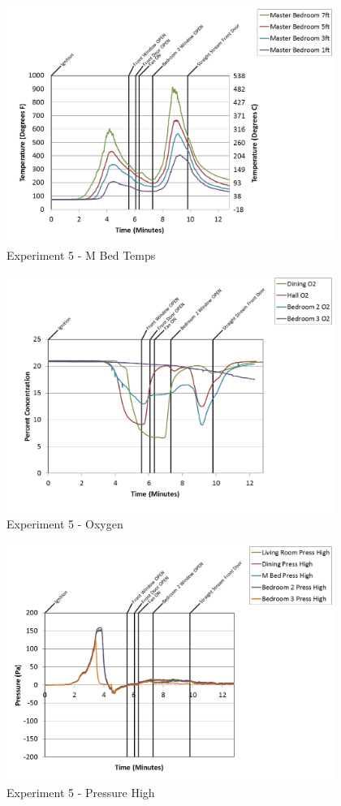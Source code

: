\documentclass{article}
\begin{document}
\begin{appendices}
\clearpage

\begin{figure}[h!]
	\centering
	\includegraphics[height=3.05in]{0_Images/Results_Charts/Exp_5_Charts/MBedTemps.png}
	\caption{Experiment 5 - M Bed Temps}
\end{figure}


\begin{figure}[h!]
	\centering
	\includegraphics[height=3.05in]{0_Images/Results_Charts/Exp_5_Charts/Oxygen.png}
	\caption{Experiment 5 - Oxygen}
\end{figure}

\clearpage

\begin{figure}[h!]
	\centering
	\includegraphics[height=3.05in]{0_Images/Results_Charts/Exp_5_Charts/PressureHigh.png}
	\caption{Experiment 5 - Pressure High}
\end{figure}



\end{appendices}
\end{document}
